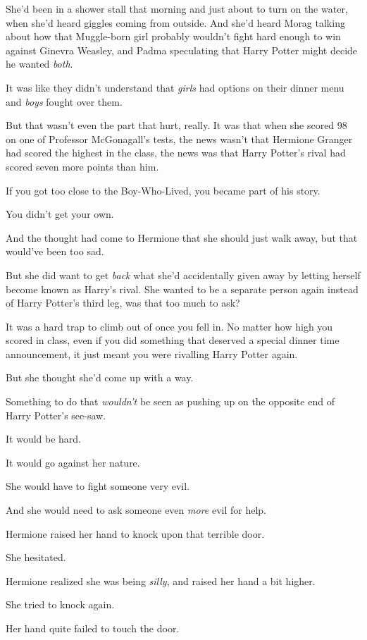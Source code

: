 She’d been in a shower stall that morning and just about to turn on the water, when she’d heard giggles coming from outside. And she’d heard Morag talking about how that Muggle-born girl probably wouldn’t fight hard enough to win against Ginevra Weasley, and Padma speculating that Harry Potter might decide he wanted \emph{both}.

It was like they didn’t understand that \emph{girls} had options on their dinner menu and \emph{boys} fought over them.

But that wasn’t even the part that hurt, really. It was that when she scored 98 on one of Professor McGonagall’s tests, the news wasn’t that Hermione Granger had scored the highest in the class, the news was that Harry Potter’s rival had scored seven more points than him.

If you got too close to the Boy-Who-Lived, you became part of his story.

You didn’t get your own.

And the thought had come to Hermione that she should just walk away, but that would’ve been too sad.

But she did want to get \emph{back} what she’d accidentally given away by letting herself become known as Harry’s rival. She wanted to be a separate person again instead of Harry Potter’s third leg, was that too much to ask?

It was a hard trap to climb out of once you fell in. No matter how high you scored in class, even if you did something that deserved a special dinner time announcement, it just meant you were rivalling Harry Potter again.

But she thought she’d come up with a way.

Something to do that \emph{wouldn’t} be seen as pushing up on the opposite end of Harry Potter’s see-saw.

It would be hard.

It would go against her nature.

She would have to fight someone very evil.

And she would need to ask someone even \emph{more} evil for help.

Hermione raised her hand to knock upon that terrible door.

She hesitated.

Hermione realized she was being \emph{silly}, and raised her hand a bit higher.

She tried to knock again.

Her hand quite failed to touch the door.

